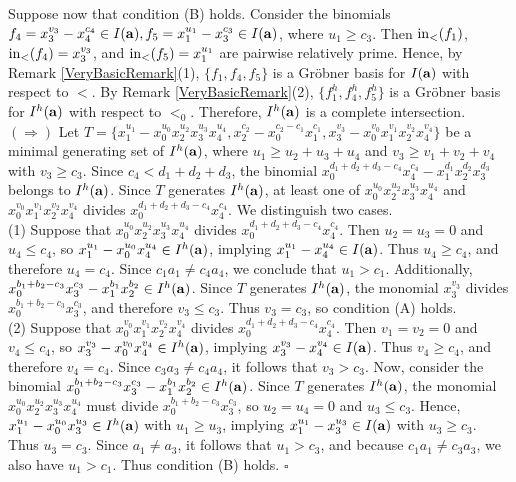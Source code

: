 \documentclass[10pt]{amsart}
\begin{document}
Suppose now that condition (B) holds. Consider the binomials $f_{4}=x_{3}^{v_3}-x_{4}^{c_4} \in I({\bf a}), f_{5}=x_{1}^{u_1}-x_{3}^{c_3} \in I({\bf a})$, where $u_1 \geq c_3$. Then ${\rm in}_{<}(f_{1})$, ${\rm in}_{<}(f_{4})=x_{3}^{v_3}$, and ${\rm in}_{<}(f_{5})=x_{1}^{u_1}$ are pairwise relatively prime. Hence, by Remark \ref{VeryBasicRemark}(1), $\{f_1, f_4, f_5\}$ is a Gr\"obner basis for $I({\bf a})$ with respect to $<$. By Remark \ref{VeryBasicRemark}(2), $\{f_1^h, f_4^h, f_5^h\}$ is a Gr\"obner basis for $I^{h}({\bf a})$ with respect to $<_{0}$. Therefore, $I^{h}({\bf a})$ is a complete intersection.\\
$(\Rightarrow)$ Let $T=\{x_{1}^{u_1}-x_{0}^{u_0}x_{2}^{u_2}x_{3}^{u_3}x_{4}^{u_4}, x_{2}^{c_2}-x_{0}^{c_2-c_1}x_{1}^{c_1}, x_{3}^{v_3}-x_{0}^{v_0}x_{1}^{v_1}x_{2}^{v_2}x_{4}^{v_4}\}$ be a minimal generating set of $I^{h}({\bf a})$, where $u_{1} \geq u_2+u_3+u_4$ and $v_{3} \geq v_1+v_2+v_4$ with $v_3 \geq c_3$. Since $c_{4}<d_{1}+d_{2}+d_3$, the binomial $x_{0}^{d_{1}+d_{2}+d_3-c_{4}}x_{4}^{c_4}-x_{1}^{d_1}x_{2}^{d_2}x_{3}^{d_3}$ belongs to $I^{h}({\bf a})$. Since $T$ generates $I^{h}({\bf a})$, at least one of $x_{0}^{u_0}x_{2}^{u_2}x_{3}^{u_3}x_{4}^{u_4}$ and $x_{0}^{v_0}x_{1}^{v_1}x_{2}^{v_2}x_{4}^{v_4}$ divides $x_{0}^{d_{1}+d_{2}+d_3-c_{4}}x_{4}^{c_4}$. We distinguish two cases.\\ (1) Suppose that $x_{0}^{u_0}x_{2}^{u_2}x_{3}^{u_3}x_{4}^{u_4}$ divides $x_{0}^{d_{1}+d_{2}+d_3-c_{4}}x_{4}^{c_4}$. Then $u_{2}=u_{3}=0$ and $u_{4} \leq c_{4}$, so $x_{1}^{u_1}-x_{0}^{u_0}x_{4}^{u_4} \in I^{h}({\bf a})$, implying $x_{1}^{u_1}-x_{4}^{u_4} \in I({\bf a})$. Thus $u_{4} \geq c_{4}$, and therefore $u_{4}=c_{4}$. Since $c_1a_1 \neq c_4a_4$, we conclude that $u_1>c_1$. Additionally, $x_{0}^{b_1+b_2-c_3}x_{3}^{c_3}-x_{1}^{b_1}x_2^{b_2} \in I^{h}({\bf a})$. Since $T$ generates $I^{h}({\bf a})$, the monomial $x_3^{v_3}$ divides $x_{0}^{b_1+b_2-c_3}x_{3}^{c_3}$, and therefore $v_3 \leq c_3$. Thus $v_3=c_3$, so condition (A) holds.\\
(2) Suppose that $x_{0}^{v_0}x_{1}^{v_1}x_{2}^{v_2}x_{4}^{v_4}$ divides $x_{0}^{d_{1}+d_{2}+d_3-c_{4}}x_{4}^{c_4}$. Then $v_{1}=v_{2}=0$ and $v_{4} \leq c_{4}$, so $x_{3}^{v_3}-x_{0}^{v_0}x_{4}^{v_4} \in I^{h}({\bf a})$, implying $x_{3}^{v_3}-x_{4}^{v_4} \in I({\bf a})$. Thus $v_{4} \geq c_4$, and therefore $v_{4}=c_{4}$. Since $c_{3}a_{3} \neq c_4a_4$, it follows that $v_3>c_{3}$. Now, consider the binomial $x_{0}^{b_1+b_2-c_3}x_{3}^{c_3}-x_{1}^{b_1}x_2^{b_2} \in I^{h}({\bf a})$. Since $T$ generates $I^{h}({\bf a})$, the monomial $x_{0}^{u_0}x_{2}^{u_2}x_{3}^{u_3}x_{4}^{u_4}$ must divide $x_{0}^{b_1+b_2-c_3}x_{3}^{c_3}$, so $u_2=u_4=0$ and $u_3 \leq c_3$. Hence, $x_1^{u_1}-x_{0}^{u_0}x_{3}^{u_3} \in I^{h}({\bf a})$ with $u_1 \geq u_3$, implying $x_1^{u_1}-x_{3}^{u_3} \in I({\bf a})$ with $u_3 \geq c_3$. Thus $u_3=c_3$. Since $a_1 \neq a_3$, it follows that $u_1>c_3$, and because $c_1a_1 \neq c_3a_3$, we also have $u_1>c_1$. Thus condition (B) holds.  \hfill $\square$
\end{document}
